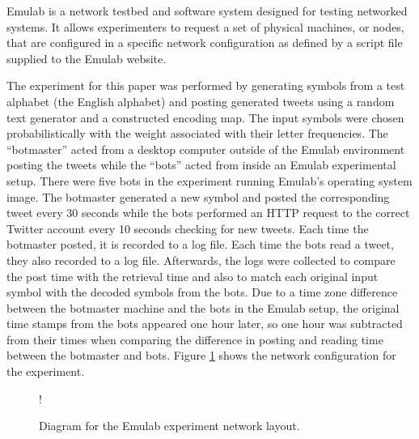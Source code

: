 Emulab \cite{emulab-rigorous} is a network testbed and software system designed for testing networked
systems.  It allows experimenters to request a set of physical machines,
or nodes, that
are configured in a specific network configuration as defined by a script
file supplied to the Emulab website.  

The experiment for this paper was performed by generating symbols from a test
alphabet (the English alphabet) and posting
generated tweets using a random text generator and a constructed encoding map.
The input symbols were chosen probabilistically with the weight associated with
their letter frequencies.
The ``botmaster'' acted from a desktop computer outside of the Emulab environment
posting the tweets while the ``bots'' acted from inside an Emulab experimental
setup.  There were five bots in the experiment running Emulab's
 operating system image.  The botmaster generated a new
symbol and posted the corresponding tweet every 30 seconds while the bots
performed an HTTP request to the correct Twitter account every 10 seconds
checking for new tweets.  Each time the botmaster posted, it is recorded
to a log file.  Each time the bots read a tweet, they also recorded to a log
file.  Afterwards, the logs were collected to compare the post time with
the retrieval time and also to match each original input symbol with the
decoded symbols from the bots.  Due to a time zone difference between the
botmaster machine and the bots in the Emulab setup, the original time stamps
from the bots appeared one hour later, so one hour was subtracted from their
times when comparing the difference in posting and reading time between the
botmaster and bots.  Figure \ref{fig:evaluation:twittercc:emulab:emulab}
shows the network configuration for the experiment. 

\begin{figure}
\centering
\resizebox {\columnwidth} {!} {
}
\caption{Diagram for the Emulab experiment network layout.}
\label{fig:evaluation:twittercc:emulab:emulab}
\end{figure}

